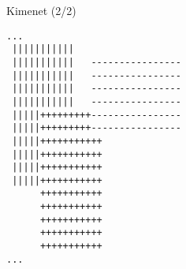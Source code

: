 \documentclass[usenames,dvipsnames,aspectratio=169]{beamer}
\begin{document}
\begin{frame}[fragile]
  \scriptsize
  \begin{block}{Kimenet (2/2)}
    \vspace{-.3cm}
    \begin{verbatim}
...
 |||||||||||                                                                   
 |||||||||||   ----------------                                                
 |||||||||||   ----------------                                                
 |||||||||||   ----------------                                                
 |||||||||||   ----------------                                                
 |||||+++++++++----------------                                                
 |||||+++++++++----------------                                                
 |||||+++++++++++                                                              
 |||||+++++++++++                                                              
 |||||+++++++++++                                                              
 |||||+++++++++++                                                              
      +++++++++++                                                              
      +++++++++++                                                              
      +++++++++++                                                              
      +++++++++++                                                              
      +++++++++++
...
\end{verbatim}
    \vspace{-.3cm}
  \end{block}
\end{frame}

\begin{frame}
  \begin{exampleblock}{}
    \scriptsize
    \vspace{-.2cm}
    
    \vspace{-.2cm}
  \end{exampleblock}
\end{frame}

\begin{frame}
  \begin{exampleblock}{}
    \tiny
    \vspace{-.2cm}
    
    \vspace{-.2cm}
  \end{exampleblock}
\end{frame}
\end{document}
